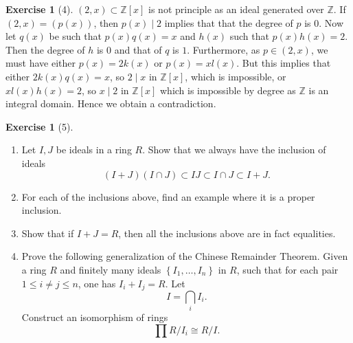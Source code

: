 \documentclass[reqno]{amsart}
\theoremstyle{definition}
\newtheorem{exercise}[theorem]{Exercise}
\theoremstyle{remark}
\begin{document}
\begin{exercise}[4]
    $\left( 2,x \right) \subset \mathbb{Z}[x]$ is not principle
    as an ideal generated over $\mathbb{Z}$.
    If $\left( 2,x \right) = \left( p(x) \right) $, then
    $p(x)  \mid 2$ implies that that the
    degree of $p$ is $0$. Now
    let $q(x)$ be such that
    $p(x)q(x) = x$ and
     $h(x)$ such that $p(x) h(x) = 2$. Then
     the degree of $h$ is $0$ and that of $q$ is $1$.
     Furthermore, as $p \in \left( 2,x \right) $, we must
     have either $p(x) = 2 k(x)$ or
     $p(x) = x l(x)$. But this implies that either
     $2 k(x) q(x) = x$, so
     $2  \mid x$ in $\mathbb{Z}[x]$, which is
     impossible, or
     $x l(x)h(x) = 2$, so
     $x  \mid 2$ in $\mathbb{Z}\left[ x \right] $ which is
     impossible by degree as $\mathbb{Z}$ is an integral
     domain. Hence
    we obtain a contradiction.
\end{exercise}

\begin{exercise}[5]
    \begin{enumerate}
        \item Let $I,J$ be ideals in a ring
            $R$. Show that we always have the inclusion
            of ideals
            \[
                \left( I+ J \right) 
                \left( I \cap J \right) 
                \subset IJ \subset I \cap J\subset 
                I+J.
            \] 
        \item For each of the inclusions above, find an example
            where it is a proper inclusion.
        \item Show that if $I + J = R$, then all
            the inclusions above are in fact equalities.
        \item Prove the following generalization of the
            Chinese Remainder Theorem. Given a ring
            $R$ and finitely many ideals
            $\left\{ I_1, \ldots, I_n \right\} $ in
            $R$, such that for each pair
            $1 \le i \neq j \le n$, one has
            $I_i + I_j = R$.
            Let
            \[
            I = \bigcap_{i} I_i .
            \] 
            Construct an isomorphism of rings
            \[
            \prod R/ I_i \cong R / I.
            \] 
    \end{enumerate}
\end{exercise}
\end{document}
